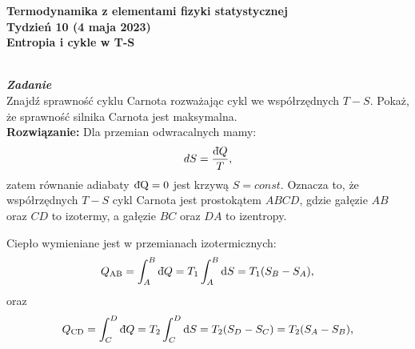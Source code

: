 \documentclass[11pt,a4paper]{article}
\newcounter{zadanie}\newcommand{\zadanie}[1][]{\addtocounter{zadanie}{1} ~\\  {\bf \emph{Zadanie \arabic{zadanie} #1 }} \\}
\newcommand{\dbar}{{\mkern3mu\mathchar'26\mkern-12mu d}}
\begin{document}

\begin{centering}
\bf{\Large{Termodynamika z elementami fizyki statystycznej}}\\
Tydzień 10 (4 maja 2023)\\[3mm]
Entropia i cykle w T-S\\
\end{centering} 
\vspace{5mm}

\zadanie
Znajdź sprawność cyklu Carnota rozważając cykl we współrzędnych $T-S$.
Pokaż, że sprawność silnika Carnota jest maksymalna.
\\
\textbf{Rozwiązanie:}
Dla przemian odwracalnych mamy:
\begin{align}
dS = \frac{{\rm \dbar} Q}{T},
\end{align}
zatem równanie adiabaty ${\rm \dbar Q}=0$ jest krzywą $S=const$.
Oznacza to, że współrzędnych $T-S$ cykl Carnota jest prostokątem $ABCD$, gdzie gałęzie $AB$ oraz $CD$ to izotermy, a gałęzie $BC$ oraz $DA$ to izentropy. \\
\begin{figure}\vspace{3mm}
\end{figure}
Ciepło wymieniane jest w przemianach izotermicznych:
\begin{align}
Q_{\rm{AB}} = \int_A^{B} {\rm \dbar} Q = T_1 \int_A^{B} {\rm d} S = T_1 (S_B-S_A),
\end{align}
oraz 
\begin{align}
Q_{\rm{CD}} = \int_C^{D} {\rm \dbar} Q = T_2 \int_C^{D} {\rm d} S = T_2 (S_D-S_C) = T_2 (S_A-S_B),
\end{align} 
\end{document}
